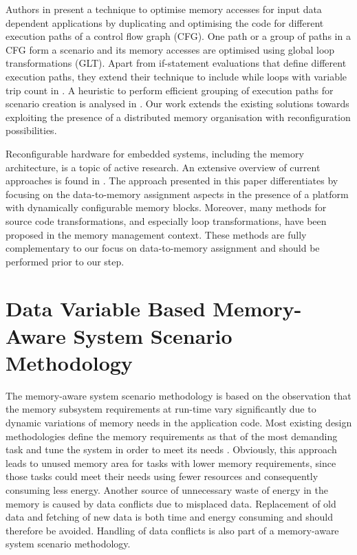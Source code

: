 \documentclass[smallcondensed]{svjour3}
\begin{document}
Authors in \cite{Pal06} present a technique to optimise memory accesses for input data dependent applications by duplicating and optimising the code for different execution paths of a control flow graph (CFG). 
One path or a group of paths in a CFG form a scenario and its memory accesses are optimised using global loop transformations (GLT). 
Apart from if-statement evaluations that define different execution paths, they extend their technique to include while loops with variable trip count in \cite{Pal06b}. 
A heuristic to perform efficient grouping of execution paths for scenario creation is analysed in \cite{Pal07}. 
Our work extends the existing solutions towards exploiting the presence of a distributed memory organisation with reconfiguration possibilities.

Reconfigurable hardware for embedded systems, including the memory architecture, is a topic of active research. 
An extensive overview of current approaches is found in \cite{Garcia}. 
The approach presented in this paper differentiates by focusing on the data-to-memory assignment aspects in the presence of a platform with dynamically configurable memory blocks. 
Moreover, many methods for source code transformations, and especially loop transformations, have been proposed in the memory management context. 
These methods are fully complementary to our focus on data-to-memory assignment and should be performed prior to our step. 

\section{Data Variable Based Memory-Aware System Scenario Methodology}
\label{sec:methodology}

The memory-aware system scenario methodology is based on the observation that the memory subsystem requirements at run-time vary significantly due to dynamic variations of memory needs in the application code. 
Most existing design methodologies define the memory requirements as that of the most demanding task and tune the system in order to meet its needs \cite{tcm}. 
Obviously, this approach leads to unused memory area for tasks with lower memory requirements, since those tasks could meet their needs using fewer resources and consequently consuming less energy. 
Another source of unnecessary waste of energy in the memory is caused by data conflicts due to misplaced data. 
Replacement of old data and fetching of new data is both time and energy consuming and should therefore be avoided. 
Handling of data conflicts is also part of a memory-aware system scenario methodology.
\end{document}
